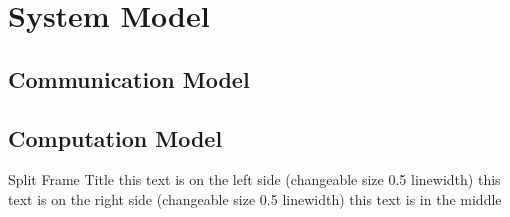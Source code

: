 \section{System Model}
\subsection{Communication Model}
\subsection{Computation Model}

\begin{splitframe}{0.5}{0.5}{Split Frame Title}
{this text is on the left side (changeable size 0.5 linewidth)}
{this text is on the right side (changeable size 0.5 linewidth)}
this text is in the middle
\end{splitframe}